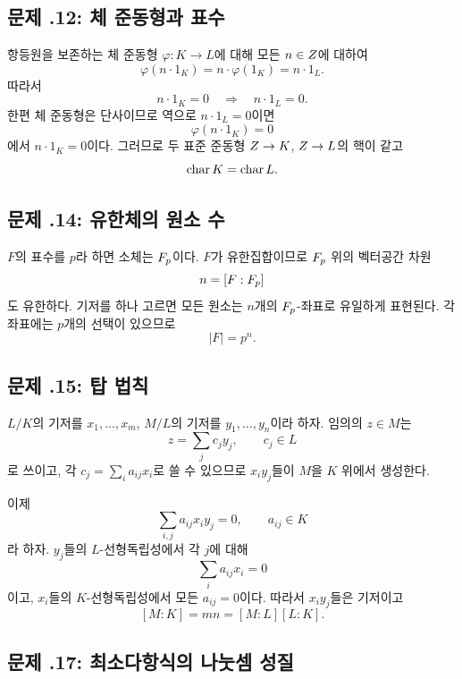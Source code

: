 \subsection*{문제 \thechapter.12: 체 준동형과 표수}

\begin{solution}
항등원을 보존하는 체 준동형 $\varphi:K\to L$에 대해 모든 $n\in Z$에 대하여
\[
  \varphi(n\cdot1_K)=n\cdot\varphi(1_K)=n\cdot1_L.
\]
따라서
\[
  n\cdot1_K=0
  \quad\Longrightarrow\quad
  n\cdot1_L=0.
\]
한편 체 준동형은 단사이므로 역으로 $n\cdot1_L=0$이면
\[
  \varphi(n\cdot1_K)=0
\]
에서 $n\cdot1_K=0$이다. 그러므로 두 표준 준동형 $Z\to K$, $Z\to L$의 핵이 같고
\[
  \operatorname{char} K=\operatorname{char} L.
\]
\end{solution}

\subsection*{문제 \thechapter.14: 유한체의 원소 수}

\begin{solution}
$F$의 표수를 $p$라 하면 소체는 $F_p$이다. $F$가 유한집합이므로 $F_p$ 위의 벡터공간 차원
\[
  n=[F:F_p]
\]
도 유한하다. 기저를 하나 고르면 모든 원소는 $n$개의 $F_p$-좌표로 유일하게 표현된다. 각 좌표에는 $p$개의 선택이 있으므로
\[
  |F|=p^n.
\]
\end{solution}

\subsection*{문제 \thechapter.15: 탑 법칙}

\begin{solution}
$L/K$의 기저를 $x_1,\dots,x_m$, $M/L$의 기저를 $y_1,\dots,y_n$이라 하자. 임의의 $z\in M$는
\[
  z=\sum_j c_jy_j,
  \qquad c_j\in L
\]
로 쓰이고, 각 $c_j=\sum_i a_{ij}x_i$로 쓸 수 있으므로 $x_iy_j$들이 $M$을 $K$ 위에서 생성한다.

이제
\[
  \sum_{i,j}a_{ij}x_iy_j=0,
  \qquad a_{ij}\in K
\]
라 하자. $y_j$들의 $L$-선형독립성에서 각 $j$에 대해
\[
  \sum_i a_{ij}x_i=0
\]
이고, $x_i$들의 $K$-선형독립성에서 모든 $a_{ij}=0$이다. 따라서 $x_iy_j$들은 기저이고
\[
  [M:K]=mn=[M:L][L:K].
\]
\end{solution}

\subsection*{문제 \thechapter.17: 최소다항식의 나눗셈 성질}

